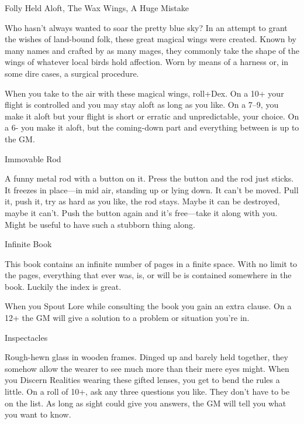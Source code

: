  

Folly Held Aloft, The Wax Wings, A Huge Mistake	 

 

Who hasn’t always wanted to soar the pretty blue sky? In an attempt to grant the wishes of land-bound folk, these great magical wings were created. Known by many names and crafted by as many mages, they commonly take the shape of the wings of whatever local birds hold affection. Worn by means of a harness or, in some dire cases, a surgical procedure.

 

When you take to the air with these magical wings, roll+Dex. On a 10+ your flight is controlled and you may stay aloft as long as you like. On a 7–9, you make it aloft but your flight is short or erratic and unpredictable, your choice. On a 6- you make it aloft, but the coming-down part and everything between is up to the GM.

 

Immovable Rod	 

 

A funny metal rod with a button on it. Press the button and the rod just sticks. It freezes in place—in mid air, standing up or lying down. It can’t be moved. Pull it, push it, try as hard as you like, the rod stays. Maybe it can be destroyed, maybe it can’t. Push the button again and it’s free—take it along with you. Might be useful to have such a stubborn thing along. 

 

Infinite Book	 

 

This book contains an infinite number of pages in a finite space. With no limit to the pages, everything that ever was, is, or will be is contained somewhere in the book. Luckily the index is great.

 

When you Spout Lore while consulting the book you gain an extra clause. On a 12+ the GM will give a solution to a problem or situation you're in.

 

Inspectacles	 

 

Rough-hewn glass in wooden frames. Dinged up and barely held together, they somehow allow the wearer to see much more than their mere eyes might. When you Discern Realities wearing these gifted lenses, you get to bend the rules a little. On a roll of 10+, ask any three questions you like. They don’t have to be on the list. As long as sight could give you answers, the GM will tell you what you want to know.

